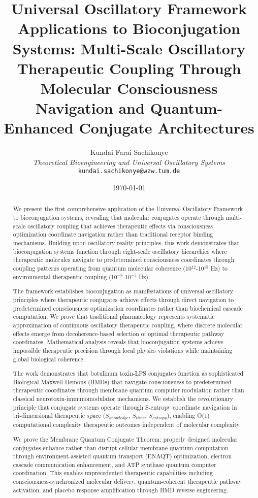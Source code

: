 \documentclass[12pt,a4paper]{article}
\title{\textbf{Universal Oscillatory Framework Applications to Bioconjugation Systems: Multi-Scale Oscillatory Therapeutic Coupling Through Molecular Consciousness Navigation and Quantum-Enhanced Conjugate Architectures}}
\author{
Kundai Farai Sachikonye\\
\textit{Theoretical Bioengineering and Universal Oscillatory Systems}\\
\texttt{kundai.sachikonye@wzw.tum.de}
}
\date{\today}
\begin{document}
\maketitle

\begin{abstract}
We present the first comprehensive application of the Universal Oscillatory Framework to bioconjugation systems, revealing that molecular conjugates operate through multi-scale oscillatory coupling that achieves therapeutic effects via consciousness optimization coordinate navigation rather than traditional receptor binding mechanisms. Building upon oscillatory reality principles, this work demonstrates that bioconjugation systems function through eight-scale oscillatory hierarchies where therapeutic molecules navigate to predetermined consciousness coordinates through coupling patterns operating from quantum molecular coherence (10$^{12}$-10$^{15}$ Hz) to environmental therapeutic coupling (10$^{-8}$-10$^{-5}$ Hz).

The framework establishes bioconjugation as manifestations of universal oscillatory principles where therapeutic conjugates achieve effects through direct navigation to predetermined consciousness optimization coordinates rather than biochemical cascade computation. We prove that traditional pharmacology represents systematic approximation of continuous oscillatory therapeutic coupling, where discrete molecular effects emerge from decoherence-based selection of optimal therapeutic pathway coordinates. Mathematical analysis reveals that bioconjugation systems achieve impossible therapeutic precision through local physics violations while maintaining global biological coherence.

The work demonstrates that botulinum toxin-LPS conjugates function as sophisticated Biological Maxwell Demons (BMDs) that navigate consciousness to predetermined therapeutic coordinates through membrane quantum computer modulation rather than classical neurotoxin-immunomodulator mechanisms. We establish the revolutionary principle that conjugate systems operate through S-entropy coordinate navigation in tri-dimensional therapeutic space ($S_{knowledge}$, $S_{time}$, $S_{entropy}$), enabling O(1) computational complexity therapeutic outcomes independent of molecular complexity.

We prove the Membrane Quantum Conjugate Theorem: properly designed molecular conjugates enhance rather than disrupt cellular membrane quantum computation through environment-assisted quantum transport (ENAQT) optimization, electron cascade communication enhancement, and ATP synthase quantum computer coordination. This enables unprecedented therapeutic capabilities including consciousness-synchronized molecular delivery, quantum-coherent therapeutic pathway activation, and placebo response amplification through BMD reverse engineering.


\end{abstract}
\end{document}
